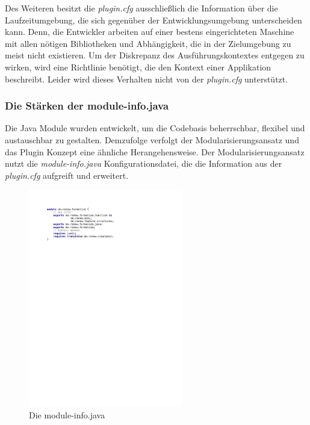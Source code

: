 			Des Weiteren besitzt die \textit{plugin.cfg} ausschließlich die Information über die Laufzeitumgebung, die sich gegenüber der Entwicklungsumgebung unterscheiden kann. Denn, die Entwickler arbeiten auf einer bestens eingerichteten Maschine mit allen nötigen Bibliotheken und Abhängigkeit, die in der Zielumgebung zu meist nicht existieren. Um der Diskrepanz des Ausführungskontextes entgegen zu wirken, wird eine Richtlinie benötigt, die den Kontext einer Applikation beschreibt. Leider wird dieses Verhalten nicht von der \textit{plugin.cfg} unterstützt. 

		\subsubsection{Die Stärken der module-info.java} \label{sub:module-info.java}
			Die Java Module wurden entwickelt, um die Codebasis beherrschbar, flexibel und austauschbar zu gestalten. Demzufolge verfolgt der Modularisierungsansatz und das Plugin Konzept eine ähnliche Herangehensweise. Der Modularisierungsansatz nutzt die \textit{module-info.java} Konfigurationsdatei, die die Information aus der \textit{plugin.cfg} aufgreift und erweitert. \newline
			\begin{figure}[h!]
			  \centering
			  \includegraphics[width=0.6\textwidth]{material/images/m-info.pdf}
			  \caption{Die module-info.java}
			  \label{fig:module_info}
			\end{figure}

